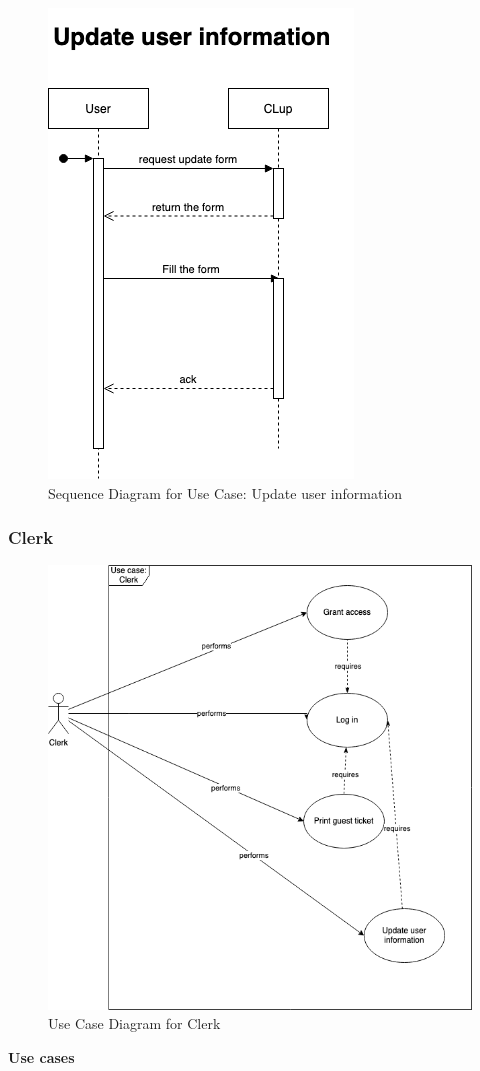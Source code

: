 \begin{figure}[H]
    \centering
    \includegraphics[height=0.5\textwidth]{Images/SequenceDiagrams/UpdateUserInformationUseCaseSequenceDiagram.png}
    \caption{Sequence Diagram for Use Case: Update user information}
\end{figure}

\subsubsection{Clerk}

\begin{figure}[H]
    \centering
    \includegraphics[height=0.5\textwidth]{Images/UseCaseDiagrams/Clerk.png}
    \caption{Use Case Diagram for Clerk}
\end{figure}

\textbf{Use cases}

